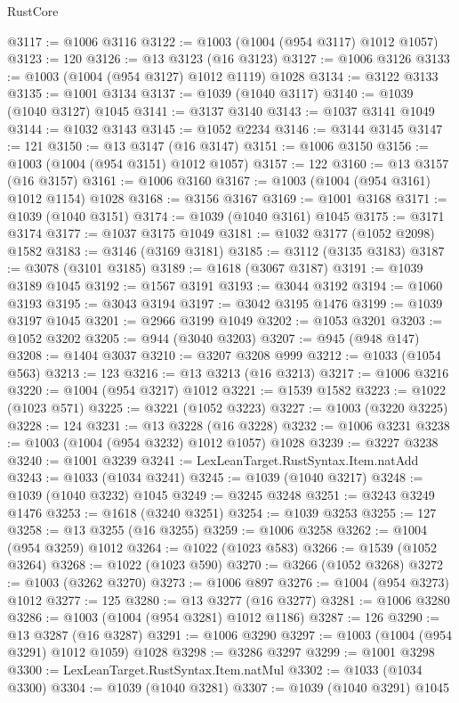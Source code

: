 \begin{lexlean}{RustCore}
\begin{coremodule}
@3117 := @1006 @3116
@3122 := @1003 (@1004 (@954 @3117) @1012 @1057)
@3123 := 120
@3126 := @13 @3123 (@16 @3123)
@3127 := @1006 @3126
@3133 := @1003 (@1004 (@954 @3127) @1012 @1119) @1028
@3134 := @3122 @3133
@3135 := @1001 @3134
@3137 := @1039 (@1040 @3117)
@3140 := @1039 (@1040 @3127) @1045
@3141 := @3137 @3140
@3143 := @1037 @3141 @1049
@3144 := @1032 @3143
@3145 := @1052 @2234
@3146 := @3144 @3145
@3147 := 121
@3150 := @13 @3147 (@16 @3147)
@3151 := @1006 @3150
@3156 := @1003 (@1004 (@954 @3151) @1012 @1057)
@3157 := 122
@3160 := @13 @3157 (@16 @3157)
@3161 := @1006 @3160
@3167 := @1003 (@1004 (@954 @3161) @1012 @1154) @1028
@3168 := @3156 @3167
@3169 := @1001 @3168
@3171 := @1039 (@1040 @3151)
@3174 := @1039 (@1040 @3161) @1045
@3175 := @3171 @3174
@3177 := @1037 @3175 @1049
@3181 := @1032 @3177 (@1052 @2098) @1582
@3183 := @3146 (@3169 @3181)
@3185 := @3112 (@3135 @3183)
@3187 := @3078 (@3101 @3185)
@3189 := @1618 (@3067 @3187)
@3191 := @1039 @3189 @1045
@3192 := @1567 @3191
@3193 := @3044 @3192
@3194 := @1060 @3193
@3195 := @3043 @3194
@3197 := @3042 @3195 @1476
@3199 := @1039 @3197 @1045
@3201 := @2966 @3199 @1049
@3202 := @1053 @3201
@3203 := @1052 @3202
@3205 := @944 (@3040 @3203)
@3207 := @945 (@948 @147)
@3208 := @1404 @3037
@3210 := @3207 @3208 @999
@3212 := @1033 (@1054 @563)
@3213 := 123
@3216 := @13 @3213 (@16 @3213)
@3217 := @1006 @3216
@3220 := @1004 (@954 @3217) @1012
@3221 := @1539 @1582
@3223 := @1022 (@1023 @571)
@3225 := @3221 (@1052 @3223)
@3227 := @1003 (@3220 @3225)
@3228 := 124
@3231 := @13 @3228 (@16 @3228)
@3232 := @1006 @3231
@3238 := @1003 (@1004 (@954 @3232) @1012 @1057) @1028
@3239 := @3227 @3238
@3240 := @1001 @3239
@3241 := LexLeanTarget.RustSyntax.Item.natAdd
@3243 := @1033 (@1034 @3241)
@3245 := @1039 (@1040 @3217)
@3248 := @1039 (@1040 @3232) @1045
@3249 := @3245 @3248
@3251 := @3243 @3249 @1476
@3253 := @1618 (@3240 @3251)
@3254 := @1039 @3253
@3255 := 127
@3258 := @13 @3255 (@16 @3255)
@3259 := @1006 @3258
@3262 := @1004 (@954 @3259) @1012
@3264 := @1022 (@1023 @583)
@3266 := @1539 (@1052 @3264)
@3268 := @1022 (@1023 @590)
@3270 := @3266 (@1052 @3268)
@3272 := @1003 (@3262 @3270)
@3273 := @1006 @897
@3276 := @1004 (@954 @3273) @1012
@3277 := 125
@3280 := @13 @3277 (@16 @3277)
@3281 := @1006 @3280
@3286 := @1003 (@1004 (@954 @3281) @1012 @1186)
@3287 := 126
@3290 := @13 @3287 (@16 @3287)
@3291 := @1006 @3290
@3297 := @1003 (@1004 (@954 @3291) @1012 @1059) @1028
@3298 := @3286 @3297
@3299 := @1001 @3298
@3300 := LexLeanTarget.RustSyntax.Item.natMul
@3302 := @1033 (@1034 @3300)
@3304 := @1039 (@1040 @3281)
@3307 := @1039 (@1040 @3291) @1045

\end{coremodule}
\end{lexlean}
